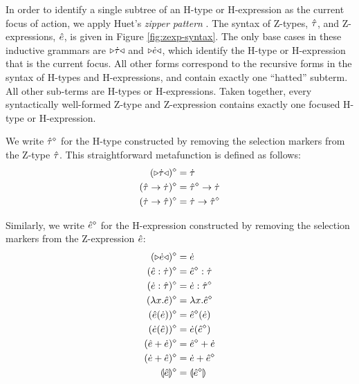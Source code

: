 \documentclass{llncs}
\begin{document}
In order to identify a single subtree of an H-type or H-expression as the current focus of action, we apply Huet's \emph{zipper pattern} \cite{JFP::Huet1997}. The syntax of Z-types, $\hat{\tau}$, and Z-expressions, $\hat{e}$, is given in Figure \ref{fig:zexp-syntax}. The only base cases in these inductive grammars are ${\triangleright}{\dot{\tau}}{\triangleleft}$ and ${\triangleright}{\dot{e}}{\triangleleft}$, which identify the H-type or H-expression that is the current focus. All other forms correspond to the recursive forms in the syntax of H-types and H-expressions, and contain exactly one ``hatted'' subterm. All other sub-terms are H-types or H-expressions. Taken together, every syntactically well-formed Z-type and Z-expression contains exactly one focused H-type or H-expression.

We write $\hat{\tau}^{\diamond}$ for the H-type constructed by removing the selection markers from the Z-type $\hat{\tau}$. This straightforward metafunction is defined as follows:
\begin{align*}
({\triangleright}{\dot{\tau}}{\triangleleft})^{\diamond} & = \dot{\tau}\\
(\hat{\tau} \rightarrow \dot{\tau})^{\diamond} & = \hat{\tau}^{\diamond} \rightarrow \dot{\tau}\\
(\dot{\tau} \rightarrow \hat{\tau})^{\diamond} & = \dot{\tau} \rightarrow \hat{\tau}^{\diamond}
\end{align*}

Similarly, we write $\hat{e}^{\diamond}$ for the H-expression constructed by removing the selection markers from the Z-expression $\hat{e}$:
\begin{align*}
({\triangleright}{\dot{e}}{\triangleleft})^{\diamond} & = \dot{e}\\
(\hat{e} : \dot{\tau})^{\diamond} & = \hat{e}^{\diamond} : \dot{\tau}\\
(\dot{e} : \hat{\tau})^{\diamond} & = \dot{e} : \hat{\tau}^{\diamond}\\
(\lambda x.\hat{e})^{\diamond} & = \lambda x.\hat{e}^{\diamond}\\
(\hat{e}(\dot{e}))^{\diamond} & = \hat{e}^{\diamond}(\dot{e})\\
(\dot{e}(\hat{e}))^{\diamond} & = \dot{e}(\hat{e}^{\diamond})\\
(\hat{e} + \dot{e})^{\diamond} & = \hat{e}^{\diamond} + \dot{e}\\
(\dot{e} + \hat{e})^{\diamond} & = \dot{e} + \hat{e}^{\diamond}\\
\llparenthesis\hat{e}\rrparenthesis^{\diamond} &= \llparenthesis\hat{e}^{\diamond}\rrparenthesis
\end{align*}
\end{document}

